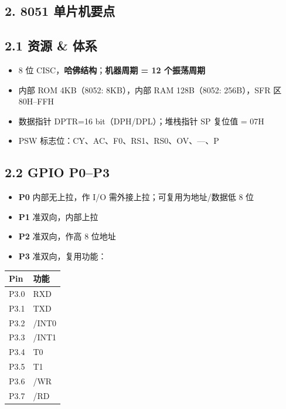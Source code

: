 \documentclass[UTF8,zihao=-5]{ctexart}
\renewcommand{\arraystretch}{0.9}
\begin{document}
\begin{multicols*}{2}
\section*{2. 8051 单片机要点}
\subsection*{2.1 资源 \& 体系}
\begin{itemize}
\item 8 位 CISC，\textbf{哈佛结构}；\textbf{机器周期 = 12 个振荡周期}
\item 内部 ROM 4KB（8052: 8KB），内部 RAM 128B（8052: 256B），SFR 区 80H–FFH
\item 数据指针 DPTR=16 bit（DPH/DPL）；堆栈指针 SP 复位值 = 07H
\item PSW 标志位：CY、AC、F0、RS1、RS0、OV、—、P
\end{itemize}
\subsection*{2.2 GPIO P0–P3}
\begin{itemize}
\item \textbf{P0} 内部无上拉，作 I/O 需外接上拉；可复用为地址/数据低 8 位
\item \textbf{P1} 准双向，内部上拉
\item \textbf{P2} 准双向，作高 8 位地址
\item \textbf{P3} 准双向，复用功能：
\end{itemize}
{\scriptsize\setlength{\tabcolsep}{1.8pt}\renewcommand{\arraystretch}{0.88}%
\begin{tabularx}{\linewidth}{@{}*{2}{Y}@{}}
\toprule
\textbf{Pin} & \textbf{功能} \\
\midrule
P3.0 & RXD \\
P3.1 & TXD \\
P3.2 & /INT0 \\
P3.3 & /INT1 \\
P3.4 & T0 \\
P3.5 & T1 \\
P3.6 & /WR \\
P3.7 & /RD \\
\bottomrule
\end{tabularx}}

\end{multicols*}
\end{document}
